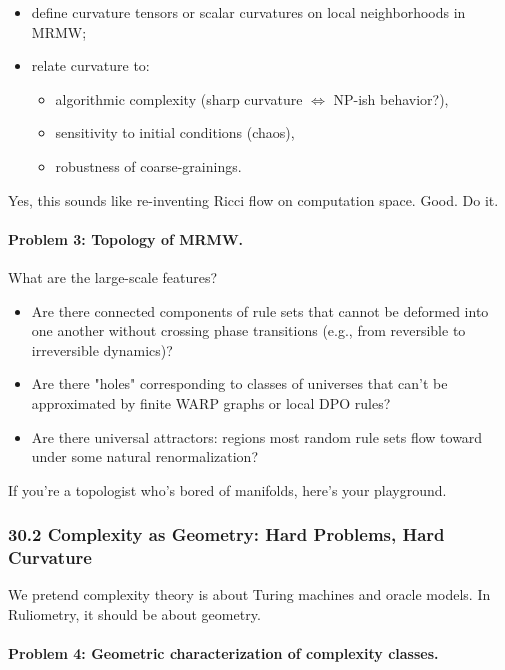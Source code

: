 \begin{itemize}
  \item define curvature tensors or scalar curvatures on local neighborhoods in MRMW;
  \item relate curvature to:
    \begin{itemize}
      \item algorithmic complexity (sharp curvature $\Leftrightarrow$ NP-ish behavior?),
      \item sensitivity to initial conditions (chaos),
      \item robustness of coarse-grainings.
    \end{itemize}
\end{itemize}

Yes, this sounds like re-inventing Ricci flow on computation space. Good. Do it.

\paragraph{Problem 3: Topology of MRMW.}

What are the large-scale features?

\begin{itemize}
  \item Are there connected components of rule sets that cannot be deformed into one another without crossing phase transitions (e.g., from reversible to irreversible dynamics)?
  \item Are there "holes" corresponding to classes of universes that can’t be approximated by finite WARP graphs or local DPO rules?
  \item Are there universal attractors: regions most random rule sets flow toward under some natural renormalization?
\end{itemize}

If you’re a topologist who’s bored of manifolds, here’s your playground.

\subsubsection*{30.2  Complexity as Geometry: Hard Problems, Hard Curvature}

We pretend complexity theory is about Turing machines and oracle models.
In Ruliometry, it should be about geometry.

\paragraph{Problem 4: Geometric characterization of complexity classes.}

